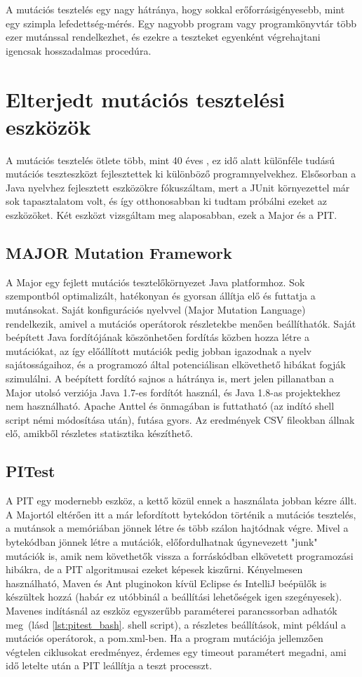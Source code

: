 A mutációs tesztelés egy nagy hátránya, hogy sokkal erőforrásigényesebb, mint egy szimpla lefedettség-mérés. Egy nagyobb program vagy programkönyvtár több ezer mutánssal rendelkezhet, és ezekre a teszteket egyenként végrehajtani igencsak hosszadalmas procedúra. 
\section{Elterjedt mutációs tesztelési eszközök}
A mutációs tesztelés ötlete több, mint 40 éves \cite{major_2011}, ez idő alatt különféle tudású mutációs teszteszközt fejlesztettek ki különböző programnyelvekhez. Elsősorban a Java nyelvhez fejlesztett eszközökre fókuszáltam, mert a JUnit környezettel már sok tapasztalatom volt, és így otthonosabban ki tudtam próbálni ezeket az eszközöket. Két eszközt vizsgáltam meg alaposabban, ezek a Major és a PIT.
\subsection{MAJOR Mutation Framework}
A Major egy fejlett mutációs tesztelőkörnyezet Java platformhoz. Sok szempontból optimalizált, hatékonyan és gyorsan állítja elő és futtatja a mutánsokat. Saját konfigurációs nyelvvel (Major Mutation Language) rendelkezik, amivel a mutációs operátorok részletekbe menően beállíthatók. Saját beépített Java fordítójának köszönhetően fordítás közben hozza létre a mutációkat, az így előállított mutációk pedig jobban igazodnak a nyelv sajátosságaihoz, és a programozó által potenciálisan elkövethető hibákat fogják szimulálni. A beépített fordító sajnos a hátránya is, mert jelen pillanatban a Major utolsó verziója Java 1.7-es fordítót használ, és Java 1.8-as projektekhez nem használható. Apache Anttel és önmagában is futtatható (az indító shell script némi módosítása után), futása gyors. Az eredmények CSV fileokban állnak elő, amikből részletes statisztika készíthető. \cite{major_manual}
\subsection{PITest}
A PIT egy modernebb eszköz, a kettő közül ennek a használata jobban kézre állt. A Majortól eltérően itt a már lefordított bytekódon történik a mutációs tesztelés, a mutánsok a memóriában jönnek létre és több szálon hajtódnak végre. Mivel a bytekódban jönnek létre a mutációk, előfordulhatnak úgynevezett "junk" mutációk is, amik nem követhetők vissza a forráskódban elkövetett programozási hibákra, de a PIT algoritmusai ezeket képesek kiszűrni. Kényelmesen használható, Maven és Ant pluginokon kívül Eclipse és IntelliJ beépülők is készültek hozzá (habár ez utóbbinál a beállítási lehetőségek igen szegényesek). Mavenes indításnál az eszköz egyszerűbb paraméterei parancssorban adhatók meg~(lásd \ref{lst:pitest_bash}. shell script), a részletes beállítások, mint például a mutációs operátorok, a pom.xml-ben. Ha a program mutációja jellemzően végtelen ciklusokat eredményez, érdemes egy timeout paramétert megadni, ami idő letelte után a PIT leállítja a teszt processzt. \cite{pit_quickstart}

